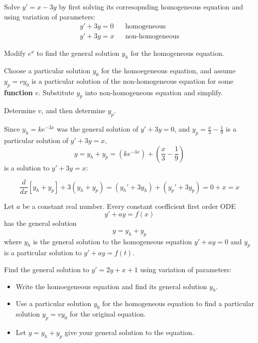 \begin{applicationActivities}
\begin{activity}{20}
Solve \(y'=x-3y\) by first solving its corresopnding homogeneous equation and using
variation of parameters: 
\begin{align*}
y'+3y = 0 & & \text{homogeneous} \\
y'+3y = x & & \text{non-homogeneous}
\end{align*}
\begin{subactivity}
Modify \(e^x\) to find the general solution \(y_h\) for the homogeneous equation.
\end{subactivity}
\begin{subactivity}
Choose a particular solution \(y_0\) for the homoegeneous equation, and
assume \(y_p = v y_0 \) is a particular solution of the non-homogeneous equation for some \textbf{function} \(v\).
Substitute \(y_p\) into non-homogeneous equation and simplify.
\end{subactivity}
\begin{subactivity}
Determine \(v\), and then determine \(y_p\).
\end{subactivity}
\end{activity}

\begin{observation}
Since \(y_h=ke^{-3x}\) was the general solution of \(y'+3y=0\), 
and \(y_p = \frac{x}{3}-\frac{1}{9}\) is a particular solution of \(y'+3y=x\), 
\[y=y_h+y_p = \left(ke^{-3x}\right)+\left(\frac{x}{3}-\frac{1}{9}\right)\]
is a solution to \(y'+3y=x\):

\vfill

\[\frac{d}{dx}[y_h+y_p]+3(y_h+y_p)=(y_h'+3y_h)+(y_p'+3y_p)=0+x=x\]
\end{observation}

\begin{fact}
Let \(a\) be a constant real number.
Every constant coefficient first order ODE
\[y'+ay=f(x)\]
has the general solution
\[y=y_h+y_p\]
where \(y_h\) is the general solution to the homogeneous equation \(y'+ay=0\)
and \(y_p\) is a particular solution to \(y'+ay=f(t)\).
\end{fact}

\begin{activity}{15}
Find the general solution to \(y'=2y+x+1\) using variation of parameters:

\vfill

\begin{itemize}
\item Write the homoegeneous equation and find its general solution \(y_h\).
\item Use a particular solution \(y_0\) for the homogeneous equation to find a particular solution
      \(y_p=vy_0\) for the original equation.
\item Let \(y=y_h+y_p\) give your general solution to the equation.
\end{itemize}
\end{activity}





\end{applicationActivities}
